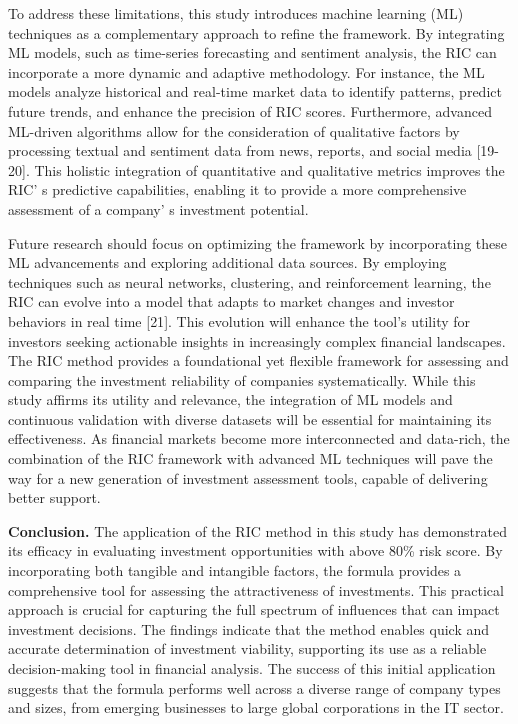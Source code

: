 \begin{multicols}{2}
To address these limitations, this study introduces machine learning
(ML) techniques as a complementary approach to refine the framework. By
integrating ML models, such as time-series forecasting and sentiment
analysis, the RIC can incorporate a more dynamic and adaptive
methodology. For instance, the ML models analyze historical and
real-time market data to identify patterns, predict future trends, and
enhance the precision of RIC scores. Furthermore, advanced ML-driven
algorithms allow for the consideration of qualitative factors by
processing textual and sentiment data from news, reports, and social
media {[}19-20{]}. This holistic integration of quantitative and
qualitative metrics improves the RIC' s predictive
capabilities, enabling it to provide a more comprehensive assessment of
a company' s investment potential.

Future research should focus on optimizing the framework by
incorporating these ML advancements and exploring additional data
sources. By employing techniques such as neural networks, clustering,
and reinforcement learning, the RIC can evolve into a model that adapts
to market changes and investor behaviors in real time {[}21{]}. This
evolution will enhance the tool's utility for investors seeking
actionable insights in increasingly complex financial landscapes. The
RIC method provides a foundational yet flexible framework for assessing
and comparing the investment reliability of companies systematically.
While this study affirms its utility and relevance, the integration of
ML models and continuous validation with diverse datasets will be
essential for maintaining its effectiveness. As financial markets become
more interconnected and data-rich, the combination of the RIC framework
with advanced ML techniques will pave the way for a new generation of
investment assessment tools, capable of delivering better support.

{\bfseries Conclusion.} The application of the RIC method in this study has
demonstrated its efficacy in evaluating investment opportunities with
above 80\% risk score. By incorporating both tangible and intangible
factors, the formula provides a comprehensive tool for assessing the
attractiveness of investments. This practical approach is crucial for
capturing the full spectrum of influences that can impact investment
decisions. The findings indicate that the method enables quick and
accurate determination of investment viability, supporting its use as a
reliable decision-making tool in financial analysis. The success of this
initial application suggests that the formula performs well across a
diverse range of company types and sizes, from emerging businesses to
large global corporations in the IT sector.


\end{multicols}
